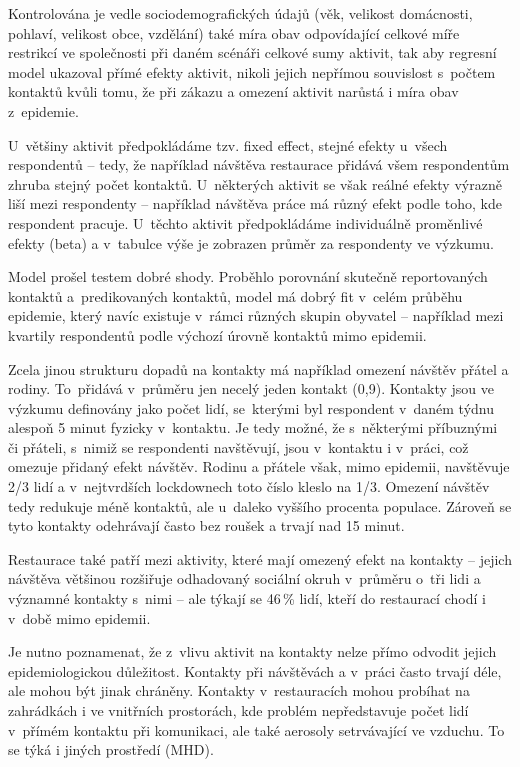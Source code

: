 Kontrolována je vedle sociodemografických údajů (věk, velikost domácnosti, pohlaví, velikost obce, vzdělání) také míra obav odpovídající celkové míře restrikcí ve společnosti při daném scénáři celkové sumy aktivit, tak aby regresní model ukazoval přímé efekty aktivit, nikoli jejich nepřímou souvislost s počtem kontaktů kvůli tomu, že při zákazu a omezení aktivit narůstá i míra obav z epidemie.

U~většiny aktivit předpokládáme tzv. fixed effect, stejné efekty u~všech respondentů – tedy, že například návštěva restaurace přidává všem respondentům zhruba stejný počet kontaktů. U některých aktivit se však reálné efekty výrazně liší mezi respondenty – například návštěva práce má různý efekt podle toho, kde respondent pracuje. U~těchto aktivit předpokládáme individuálně proměnlivé efekty (beta) a v tabulce výše je zobrazen průměr za respondenty ve výzkumu.

Model prošel testem dobré shody. Proběhlo porovnání skutečně reportovaných kontaktů a predikovaných kontaktů, model má dobrý fit v celém průběhu epidemie, který navíc existuje v rámci různých skupin obyvatel – například mezi kvartily respondentů podle výchozí úrovně kontaktů mimo epidemii.
\vspace{1em}

Zcela jinou strukturu dopadů na kontakty má například omezení návštěv přátel a rodiny. To přidává v průměru jen necelý jeden kontakt (0,9). Kontakty jsou ve výzkumu definovány jako počet lidí, se kterými byl respondent v daném týdnu alespoň 5 minut fyzicky v kontaktu. Je tedy možné, že s některými příbuznými či přáteli, s nimiž se respondenti navštěvují, jsou v kontaktu i v práci, což omezuje přidaný efekt návštěv. Rodinu a přátele však, mimo epidemii, navštěvuje 2/3 lidí a v nejtvrdších lockdownech toto číslo kleslo na 1/3. Omezení návštěv tedy redukuje méně kontaktů, ale u~daleko vyššího procenta populace. Zároveň se tyto kontakty odehrávají často bez roušek a trvají nad 15 minut. 

Restaurace také patří mezi aktivity, které mají omezený efekt na kontakty – jejich návštěva většinou rozšiřuje odhadovaný sociální okruh v průměru o~tři lidi a významné kontakty s nimi – ale týkají se 46\,\% lidí, kteří do restaurací chodí i v době mimo epidemii. 

Je nutno poznamenat, že z vlivu aktivit na kontakty nelze přímo odvodit jejich epidemiologickou důležitost. Kontakty při návštěvách a v práci často trvají déle, ale mohou být jinak chráněny. Kontakty v restauracích mohou probíhat na zahrádkách i ve vnitřních prostorách, kde problém nepředstavuje počet lidí v přímém kontaktu při komunikaci, ale také aerosoly setrvávající ve vzduchu. To se týká i jiných prostředí (MHD). 

